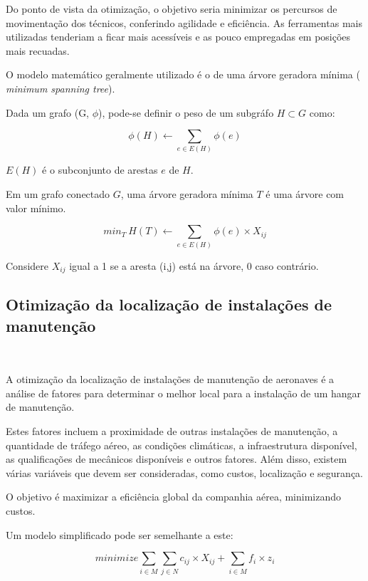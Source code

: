 \documentclass{abntex2}
\begin{document}
\begin{sloppypar}
Do ponto de vista da otimização, o objetivo seria minimizar os percursos de movimentação dos técnicos, conferindo agilidade e eficiência. As ferramentas mais utilizadas tenderiam a ficar mais acessíveis e as pouco empregadas em posições mais recuadas.

O modelo matemático geralmente utilizado é o de uma árvore geradora mínima (\textit{ minimum spanning tree}).

Dada um grafo (G, $\phi$), pode-se definir o peso de um subgráfo $H \subset G$ como:

\begin{equation} \label{eq:fo1}
\phi(H) \gets \sum_{e \in E(H)} \phi (e)
\end{equation}

$E(H)$ é o subconjunto de arestas $e$ de $H$.

Em um grafo conectado $G$, uma árvore geradora mínima $T$ é uma árvore com valor mínimo.

\begin{equation} \label{eq:fo2}
min_T\ H(T) \gets \sum_{e \in E(H)} \phi (e) \times X_{ij}
\end{equation}


Considere $X_{ij}$ igual a 1 se a aresta (i,j) está na árvore, 0 caso contrário.


\subsection{Otimização da localização de instalações de manutenção}\

A otimização da localização de instalações de manutenção de aeronaves é a análise de fatores para determinar o melhor local para a instalação de um hangar de manutenção.

Estes fatores incluem a proximidade de outras instalações de manutenção, a quantidade de tráfego aéreo, as condições climáticas, a infraestrutura disponível, as qualificações de mecânicos disponíveis e outros fatores. Além disso, existem várias variáveis que devem ser consideradas, como custos, localização e segurança.

O objetivo é maximizar a eficiência global da companhia aérea, minimizando custos.

Um modelo simplificado pode ser semelhante a este:


\begin{equation} \label{eq:fo3}
minimize \sum_{i \in M} \sum_{j \in N} c_{ij} \times X_{ij} + \sum_{i \in M} f_i \times z_i
\end{equation}


\end{sloppypar}
\end{document}
